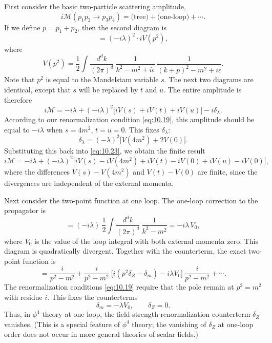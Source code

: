 First consider the basic two-particle scattering amplitude,
\begin{equation}
  i\mathcal{M}(p_1p_2\to p_3p_4) = \text{(tree)} + \text{(one-loop)}
    + \cdots .
\end{equation}
If we define $p = p_1+p_2$, then the second diagram is
\begin{equation}
  = (-i\lambda)^2\cdot iV(p^2) ,
  \label{eq:10.21}
\end{equation}
where
\begin{equation}
  V(p^2) = \frac{1}{2}\int \frac{d^dk}{(2\pi)^d}\ \frac{1}{k^2-m^2+i\epsilon}\
    \frac{1}{(k+p)^2-m^2+i\epsilon} .
  \label{eq:10.22}
\end{equation}
Note that $p^2$ is equal to the Mandelstam variable $s$.  The next two diagrams
are identical, except that $s$ will be replaced by $t$ and $u$.  The entire
amplitude is therefore
\begin{equation}
  i\mathcal{M} = -i\lambda + (-i\lambda)^2\bigl[ iV(s) + iV(t) + iV(u) \bigr]
    - i\delta_\lambda .
  \label{eq:10.23}
\end{equation}
According to our renormalization condition \eqref{eq:10.19}, this amplitude
should be equal to $-i\lambda$ when $s = 4m^2$, $t = u = 0$.  This fixes
$\delta_\lambda$:
\begin{equation}
  \delta_\lambda = (-\lambda)^2\bigl[ V(4m^2) + 2V(0) \bigr] .
  \label{eq:10.24}
\end{equation}
Substituting this back into \eqref{eq:10.23}, we obtain the finite result
\begin{equation}
  i\mathcal{M} = -i\lambda + (-i\lambda)^2\bigl[ iV(s) - iV(4m^2)
    + iV(t) - iV(0) + iV(u) - iV(0) \bigr] ,
\end{equation}
where the differences $V(s) - V(4m^2)$ and $V(t) - V(0)$ are finite, since the
divergences are independent of the external momenta.

Next consider the two-point function at one loop.  The one-loop correction to
the propagator is
\begin{equation}
  = (-i\lambda)\ \frac{1}{2}\int \frac{d^dk}{(2\pi)^d}\ \frac{1}{k^2-m^2}
  = -i\lambda\,V_0 ,
\end{equation}
where $V_0$ is the value of the loop integral with both external momenta zero.
This diagram is quadratically divergent.  Together with the counterterm, the
exact two-point function is
\begin{equation}
  = \frac{i}{p^2-m^2} + \frac{i}{p^2-m^2}\ \bigl[
    i(p^2\delta_Z - \delta_m) - i\lambda V_0 \bigr]\ \frac{i}{p^2-m^2}
    + \cdots .
  \label{eq:10.28}
\end{equation}
The renormalization conditions \eqref{eq:10.19} require that the pole remain
at $p^2 = m^2$ with residue $i$.  This fixes the counterterms
\begin{equation}
  \delta_m = -\lambda V_0,\qquad \delta_Z = 0 .
  \label{eq:10.29}
\end{equation}
Thus, in $\phi^4$ theory at one loop, the field-strength renormalization
counterterm $\delta_Z$ vanishes.  (This is a special feature of $\phi^4$
theory; the vanishing of $\delta_Z$ at one-loop order does not occur in more
general theories of scalar fields.)

